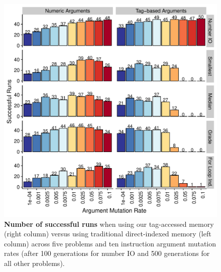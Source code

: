 \begin{figure}
  \centering
  \includegraphics[width=0.75\columnwidth]{chapters/06-tag-access-memory/media/problem-solving-success.pdf}
  \caption{\small 
  \textbf{Number of successful runs} when using our tag-accessed memory (right column) versus using traditional direct-indexed memory (left column) across five problems and ten instruction argument mutation rates (after 100 generations for number IO and 500 generations for all other problems).
  }
  \label{chapter:tag-accessed-memory:fig:successful-runs}
\end{figure}
